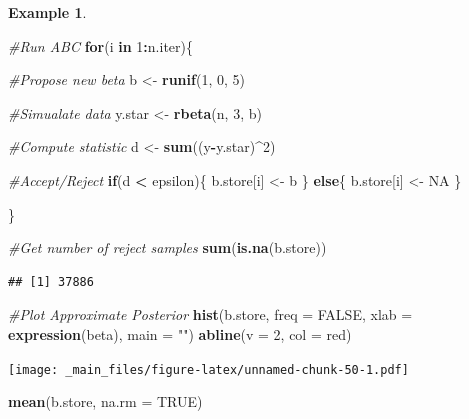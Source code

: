 \documentclass[
]{book}
\newenvironment{Shaded}{\begin{snugshade}}{\end{snugshade}}
\newcommand{\AttributeTok}[1]{\textcolor[rgb]{0.13,0.29,0.53}{#1}}
\newcommand{\CommentTok}[1]{\textcolor[rgb]{0.56,0.35,0.01}{\textit{#1}}}
\newcommand{\ConstantTok}[1]{\textcolor[rgb]{0.56,0.35,0.01}{#1}}
\newcommand{\ControlFlowTok}[1]{\textcolor[rgb]{0.13,0.29,0.53}{\textbf{#1}}}
\newcommand{\DecValTok}[1]{\textcolor[rgb]{0.00,0.00,0.81}{#1}}
\newcommand{\FunctionTok}[1]{\textcolor[rgb]{0.13,0.29,0.53}{\textbf{#1}}}
\newcommand{\NormalTok}[1]{#1}
\newcommand{\OtherTok}[1]{\textcolor[rgb]{0.56,0.35,0.01}{#1}}
\newcommand{\SpecialCharTok}[1]{\textcolor[rgb]{0.81,0.36,0.00}{\textbf{#1}}}
\newcommand{\StringTok}[1]{\textcolor[rgb]{0.31,0.60,0.02}{#1}}
\theoremstyle{definition}
\theoremstyle{definition}
\newtheorem{example}{Example}[chapter]
\theoremstyle{definition}
\theoremstyle{definition}
\theoremstyle{remark}
\begin{document}
\begin{example}
\begin{Shaded}
\begin{Highlighting}[]
\CommentTok{\#Run ABC}
\ControlFlowTok{for}\NormalTok{(i }\ControlFlowTok{in} \DecValTok{1}\SpecialCharTok{:}\NormalTok{n.iter)\{}
  
  \CommentTok{\#Propose new beta}
\NormalTok{  b }\OtherTok{\textless{}{-}} \FunctionTok{runif}\NormalTok{(}\DecValTok{1}\NormalTok{, }\DecValTok{0}\NormalTok{, }\DecValTok{5}\NormalTok{)}
  
  \CommentTok{\#Simualate data}
\NormalTok{  y.star }\OtherTok{\textless{}{-}} \FunctionTok{rbeta}\NormalTok{(n, }\DecValTok{3}\NormalTok{, b)}
  
  \CommentTok{\#Compute statistic}
\NormalTok{  d }\OtherTok{\textless{}{-}} \FunctionTok{sum}\NormalTok{((y}\SpecialCharTok{{-}}\NormalTok{y.star)}\SpecialCharTok{\^{}}\DecValTok{2}\NormalTok{)}
  
  \CommentTok{\#Accept/Reject}
  \ControlFlowTok{if}\NormalTok{(d }\SpecialCharTok{\textless{}}\NormalTok{ epsilon)\{}
\NormalTok{    b.store[i] }\OtherTok{\textless{}{-}}\NormalTok{ b}
\NormalTok{  \} }\ControlFlowTok{else}\NormalTok{\{}
\NormalTok{    b.store[i] }\OtherTok{\textless{}{-}} \ConstantTok{NA}
\NormalTok{  \}}
  
\NormalTok{\}}

\CommentTok{\#Get number of reject samples}
\FunctionTok{sum}\NormalTok{(}\FunctionTok{is.na}\NormalTok{(b.store))}
\end{Highlighting}
\end{Shaded}

\begin{verbatim}
## [1] 37886
\end{verbatim}

\begin{Shaded}
\begin{Highlighting}[]
\CommentTok{\#Plot Approximate Posterior}
\FunctionTok{hist}\NormalTok{(b.store, }\AttributeTok{freq =} \ConstantTok{FALSE}\NormalTok{, }\AttributeTok{xlab =} \FunctionTok{expression}\NormalTok{(beta), }\AttributeTok{main =} \StringTok{""}\NormalTok{)}
\FunctionTok{abline}\NormalTok{(}\AttributeTok{v =} \DecValTok{2}\NormalTok{, }\AttributeTok{col =} \StringTok{\textquotesingle{}red\textquotesingle{}}\NormalTok{)}
\end{Highlighting}
\end{Shaded}

\texttt{[image: \_main\_files/figure-latex/unnamed-chunk-50-1.pdf]}

\begin{Shaded}
\begin{Highlighting}[]
\FunctionTok{mean}\NormalTok{(b.store, }\AttributeTok{na.rm =} \ConstantTok{TRUE}\NormalTok{)}
\end{Highlighting}
\end{Shaded}


\end{example}
\end{document}
